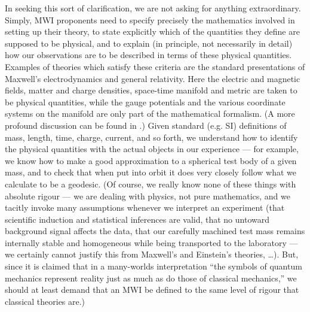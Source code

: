 \documentclass[aps,pra,12pt]{revtex4}
\begin{document}
In seeking this sort of clarification, we are not asking for anything 
extraordinary.  Simply, MWI proponents need to specify precisely the
mathematics involved in setting up their theory, to state 
explicitly which of the quantities they define are supposed to be 
physical, and to explain (in principle, not necessarily in detail) how our 
observations are
to be described in terms of these physical quantities.  
Examples of theories which satisfy these criteria are the standard 
presentations of Maxwell's electrodynamics and general relativity.
Here the electric and magnetic fields, matter and charge
densities, space-time manifold and metric are taken to be physical quantities,
while the gauge potentials and the various coordinate systems on the manifold
are only part of the mathematical formalism. 
(A more profound discussion can be found in \cite{bell4}.) 
Given standard (e.g. SI) definitions of mass, length, time, charge, 
current, and so forth, we understand how to identify the physical quantities
with the actual objects in our experience --- for example, we know how
to make a good approximation to a spherical test body of a given mass, and to
check that when put into orbit it does very closely follow what we calculate
to be a geodesic. 
(Of course, we really know none of these things with absolute rigour --- we are
dealing with physics, not pure mathematics, and we tacitly invoke many 
assumptions whenever we interpret an experiment (that scientific induction and
statistical inferences are valid, that no untoward background signal affects 
the data, that our carefully machined test mass remains internally stable and 
homogeneous while being transported to the laboratory --- we certainly cannot 
justify this from Maxwell's and Einstein's theories, \ldots). 
But, since it is claimed that in a many-worlds interpretation 
``the symbols
of quantum mechanics represent reality just as much as do those of 
classical mechanics,'' \cite{dew} we should at least demand that an MWI 
be defined to the same level of rigour that classical theories are.) 
\end{document}

